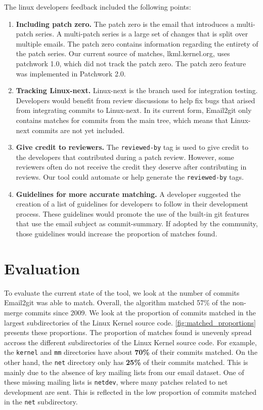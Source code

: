 The linux developers feedback included the following points:
\begin{enumerate}
	\item \textbf{Including patch zero.} The patch zero is the email that introduces a multi-patch series. A multi-patch series is a large set of changes that is split over multiple emails. The patch zero contains information regarding the entirety of the patch series. Our current source of matches, lkml.kernel.org, uses patchwork 1.0, which did not track the patch zero. The patch zero feature was implemented in Patchwork 2.0.

	\item \textbf{Tracking Linux-next.} Linux-next is the branch used for integration testing. Developers would benefit from review discussions to help fix bugs that arised from integrating commits to Linux-next. In its current form, Email2git only contains matches for commits from the main tree, which means that Linux-next commits are not yet included.

	\item \textbf{Give credit to reviewers.} The \texttt{reviewed-by} tag is used to give credit to the developers that contributed during a patch review. However, some reviewers often do not receive the credit they deserve after contributing in reviews. Our tool could automate or help generate the \texttt{reviewed-by} tags.

	\item \textbf{Guidelines for more accurate matching.} A developer suggested the creation of a list of guidelines for developers to follow in their development process. These guidelines would promote the use of the built-in git features that use the email subject as commit-summary. If adopted by the community, those guidelines would increase the proportion of matches found. 
\end{enumerate}


\section{Evaluation}

To evaluate the current state of the tool, we look at the number of commits Email2git was able to match. Overall, the algorithm matched 57\% of the non-merge commits since 2009. We look at the proportion of commits matched in the largest subdirectories of the Linux Kernel source code. \autoref{fig:matched_proportions} presents these proportions. The proportion of matches found is unevenly spread accross the different subdirectories of the Linux Kernel source code. For example, the \texttt{kernel} and \texttt{mm} directories have about \textbf{70\%} of their commits matched. On the other hand, the \texttt{net} directory only has \textbf{25\%} of their commits matched. This is mainly due to the absence of key mailing lists from our email dataset. One of these missing mailing lists is \texttt{netdev}, where many patches related to net development are sent. This is reflected in the low proportion of commits matched in the \texttt{net} subdirectory. 


